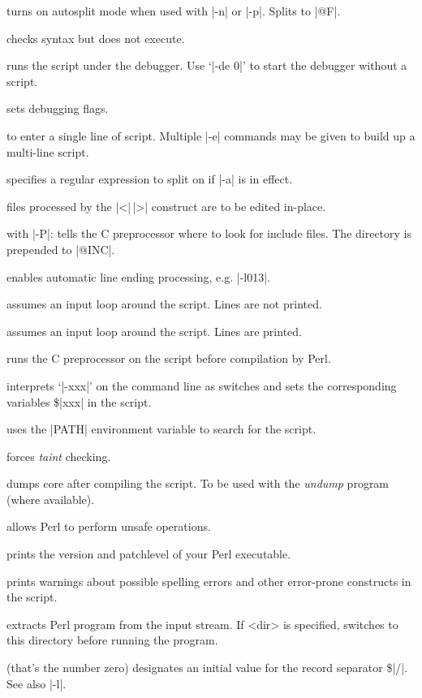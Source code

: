 \documentclass{refbase}
\begin{document}
\begin{enum}{1cm}

 turns on autosplit mode when used with |-n| or
|-p|. Splits to |@F|.

 checks syntax but does not execute.

 runs the script under the debugger. Use `|-de 0|' to
start the debugger without a script.

 sets debugging flags. 

 to enter a single line of
script. Multiple |-e| commands may be given to build up a
multi-line script.

 specifies a regular expression to split on 
if |-a| is in effect.

 files processed by the |<|\,|>| construct are
to be edited in-place.

 with |-P|: tells the C preprocessor where
to look for include files. The directory is prepended to |@INC|.

 enables automatic line ending processing, 
e.g. |-l013|.

 assumes an input loop around the script. Lines are not
printed.

 assumes an input loop around the script. Lines are
printed.

 runs the C preprocessor on the script before
compilation by Perl.

 interprets `|-xxx|' on the command line as
switches and sets the corresponding variables \$|xxx| in the script.

 uses the |PATH| environment variable to search for
the script.

 forces \textit{taint} checking.

 dumps core after compiling the script. To be used with
the {\it undump\/} program (where available).

 allows Perl to perform unsafe operations.

 prints the version and patchlevel of your Perl
executable.

 prints warnings about possible spelling errors and
other error-prone constructs in the script.

 extracts Perl program from the input stream.
If <dir> is specified, switches to this directory before running 
the program.

 (that's the number zero) designates an
initial value for the record separator \$|/|.
See also |-l|.

\end{enum}
\end{document}
